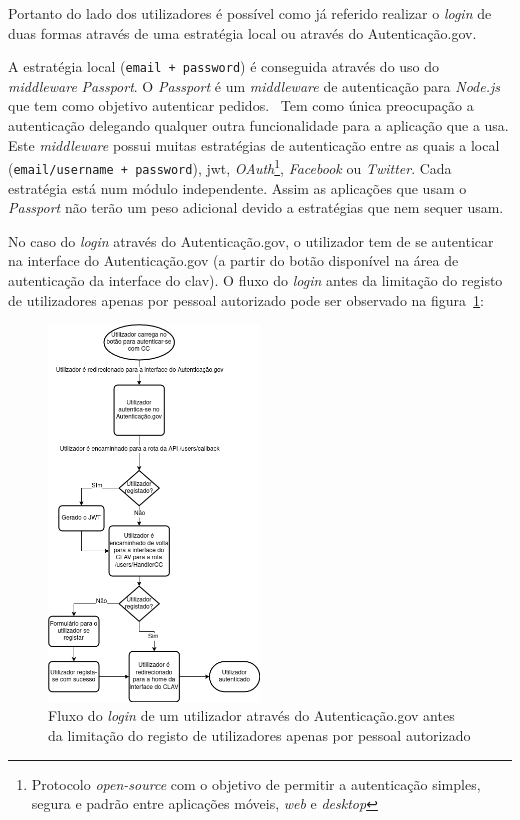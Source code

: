 Portanto do lado dos utilizadores é possível como já referido realizar o \textit{login} de duas formas através de 
uma estratégia local ou através do Autenticação.gov.

A estratégia local (\texttt{email + password}) é conseguida através do uso do \textit{middleware} \textit{Passport}.
O \textit{Passport} é um \textit{middleware} de autenticação para \textit{Node.js} que tem como objetivo autenticar 
pedidos.~\cite{passport} Tem como única preocupação a autenticação delegando qualquer outra funcionalidade para a 
aplicação que a usa. Este \textit{middleware} possui muitas estratégias de autenticação entre as quais a 
local (\texttt{email/username + password}), \acrshort{jwt}, \textit{OAuth}\footnote{Protocolo \textit{open-source} 
com o objetivo de permitir a autenticação simples, segura e padrão entre aplicações móveis, \textit{web} e 
\textit{desktop}}, \textit{Facebook} ou \textit{Twitter}. Cada estratégia está num módulo independente. 
Assim as aplicações que usam o \textit{Passport} não terão um peso adicional devido a estratégias que nem sequer usam.

No caso do \textit{login} através do Autenticação.gov, o utilizador tem de se autenticar na interface do 
Autenticação.gov (a partir do botão disponível na área de autenticação da interface do \acrshort{clav}). 
O fluxo do \textit{login} antes da limitação do registo de utilizadores apenas por pessoal autorizado pode ser observado na figura~\ref{fig:authgov}:

\begin{figure}[H]
    \centering
    \includegraphics[width=0.5\textwidth]{img/authgov.png}
    \caption{Fluxo do \textit{login} de um utilizador através do Autenticação.gov antes da limitação do registo de utilizadores apenas por pessoal autorizado}\label{fig:authgov}
\end{figure}

